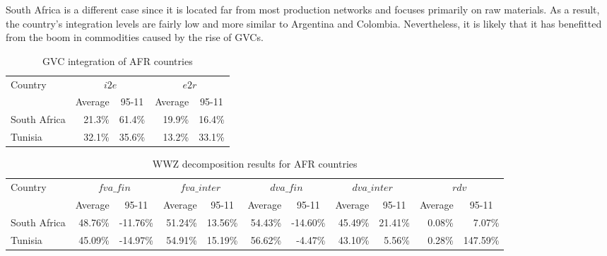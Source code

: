 \documentclass[11pt,a4paper]{article}
\begin{document}
South Africa is a different case since it is located far from most production networks and focuses primarily on raw materials. As a result, the country's integration levels are fairly low and more similar to Argentina and Colombia. Nevertheless, it is likely that it has benefitted from the boom in commodities caused by the rise of GVCs.

\begin{table}[htbp]\small
  \centering
  \caption{GVC integration of AFR countries}
    \begin{tabular}{lrrrr}
    \toprule
    Country & \multicolumn{2}{c}{\multirow{1}[0]{*}{$i2e$}} & \multicolumn{2}{c}{\multirow{1}[0]{*}{$e2r$}} \\
    \multicolumn{1}{c}{} & \multicolumn{1}{c}{Average} & \multicolumn{1}{c}{95-11} & \multicolumn{1}{c}{Average} & \multicolumn{1}{c}{95-11} \\
    \midrule
    South Africa & 21.3\% & 61.4\% & 19.9\% & 16.4\% \\
    Tunisia & 32.1\% & 35.6\% & 13.2\% & 33.1\% \\
\bottomrule
\end{tabular}
  \label{tab:afrgvc}
\end{table}

\begin{table}[htbp]\small
  \centering
  \caption{WWZ decomposition results for AFR countries}
  \hspace*{-2.7cm}
    \begin{tabular}{lrrrrrrrrrr} 
    \toprule
    \multicolumn{1}{l}{\multirow{1}[0]{*}{Country}} & \multicolumn{2}{c}{$fva\_fin$} & \multicolumn{2}{c}{$fva\_inter$} & \multicolumn{2}{c}{$dva\_fin$} & \multicolumn{2}{c}{$dva\_inter$} & \multicolumn{2}{c}{$rdv$} \\
    \multicolumn{1}{l}{} & \multicolumn{1}{c}{Average} & \multicolumn{1}{c}{95-11} &
\multicolumn{1}{c}{Average} & \multicolumn{1}{c}{95-11} & \multicolumn{1}{c}{Average} & \multicolumn{1}{c}{95-11} & \multicolumn{1}{c}{Average} & \multicolumn{1}{c}{95-11} & \multicolumn{1}{c}{Average} & \multicolumn{1}{c}{95-11} \\
  \midrule
South Africa & 48.76\% & -11.76\% & 51.24\% & 13.56\% & 54.43\% & -14.60\% & 45.49\% & 21.41\% & 0.08\% & 7.07\% \\
    Tunisia & 45.09\% & -14.97\% & 54.91\% & 15.19\% & 56.62\% & -4.47\% & 43.10\% & 5.56\% & 0.28\% & 147.59\% \\
\bottomrule
    \end{tabular}
  \label{tab:afrwwz}
\end{table}
\end{document}
